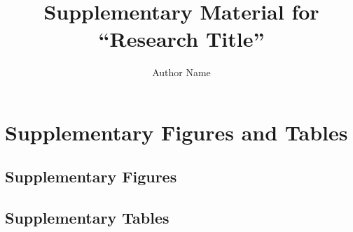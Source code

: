 \documentclass[a4paper,10pt]{article}
\title{Supplementary Material for\\``Research Title''}
\author{Author Name}
\date{}
\begin{document}
\maketitle

\section*{Supplementary Figures and Tables}

\subsection*{Supplementary Figures}

\subsection*{Supplementary Tables}
\end{document}
